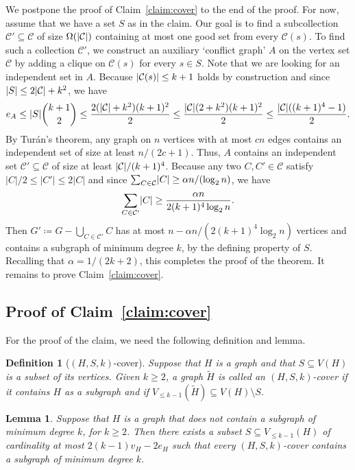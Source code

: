 \documentclass[11pt]{article}
\numberwithin{theorem}{section}
\newtheorem{lemma}[theorem]{Lemma}
\newtheorem{definition}[theorem]{Definition}
\DeclarePairedDelimiter\abs{\lvert}{\rvert}
\begin{document}
We postpone the proof of Claim~\ref{claim:cover} to the end of the proof.
For now, assume that we have a set $S$ as in the claim.
Our goal is to find a subcollection $\mathcal C'\subseteq \mathcal C$
of size $\Omega(\abs{\mathcal C})$ containing at most one good set
from every $\mathcal C(s)$.
To find such a collection $\mathcal C'$, we construct an auxiliary `conflict
graph' $A$ on the vertex set $\mathcal C$ by adding a clique on $\mathcal
C(s)$ for every $s\in S$. Note that we are looking for an independent set
in $A$. Because $\abs{\mathcal C(s)}\leq k+1$ holds by construction and
since $|S|\leq 2\abs{\mathcal C}+k^2$, we have
\[ e_A \leq \abs S \binom{k+1}{2} \leq \frac{2(\abs{\mathcal C}+k^2)
(k+1)^2}{2} \leq \frac{\abs{\mathcal C} (2+k^2)(k+1)^2}{2} \leq
\frac{\abs{\mathcal C}((k+1)^4-1)}{2}. \]
By Turán's theorem, any graph on $n$ vertices with at most $cn$ edges contains
an independent set of size at least $n/(2c+1)$. Thus, $A$ contains an
independent set $\mathcal{C'}\subseteq \mathcal C$ of size at least
$\abs{\mathcal C}/(k+1)^4$.
Because any two $C,C'\in \mathcal C$ satisfy $|C|/2\leq |C'|\leq 2|C|$ and
since $\sum_{C\in\mathcal C} \abs{C} \ge \alpha n/(\log_2 n)$, we have
\[ \sum_{C\in \mathcal C'} \abs{C}\geq \frac{\alpha n}{2(k+1)^4\log_2 n}. \]
Then $G'\coloneqq G-\bigcup_{C\in \mathcal C'} C$ has at most
$n-\alpha n/(2(k+1)^4 \log_2 n)$ vertices and contains a subgraph of minimum
degree $k$, by the defining property of $S$. Recalling that $\alpha =
1/(2k+2)$, this completes the proof of the theorem.
It remains to prove Claim~\ref{claim:cover}.

\subsection{Proof of Claim~\ref{claim:cover}}

For the proof of the claim, we need the following definition and lemma.

\begin{definition}[$(H,S,k)$-cover]
  Suppose that $H$ is a graph and that $S\subseteq V(H)$ is a subset of its
  vertices. Given $k\geq 2$, a graph $\tilde H$ is called an \emph{$(H,
  S,k)$-cover} if it contains $H$ as a subgraph and if 
  $V_{\leq k-1}(\tilde H)\subseteq V(H)\setminus S$.
\end{definition}

\begin{lemma}\label{lemma:cover}
  Suppose that $H$ is a graph that does not contain a subgraph of minimum
  degree $k$, for $k\geq 2$. Then there exists a subset $S \subseteq V_{\leq
  k-1}(H)$ of cardinality at most $2(k-1)v_H-2e_H$ such that every
  $(H,S,k)$-cover contains a subgraph of minimum degree $k$.
\end{lemma}
\end{document}
